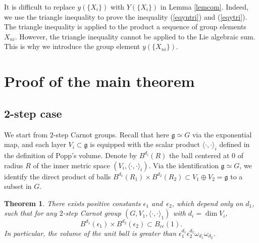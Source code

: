 \documentclass[10pt,a4paper]{amsart}
\numberwithin{equation}{section}
\newtheorem{Theorem}{Theorem}[section]
\newcommand{\g}{\mathfrak{g}}
\begin{document}
\begin{Remark}
 It is difficult to replace $y(\{X_i\})$ with $Y(\{X_i\})$ in Lemma \ref{lemcom}.
 Indeed,
 we use the triangle inequality to prove the inequality (\ref{eqyntri}) and (\ref{eqytri}).
 The triangle inequality is applied to the product a sequence of group elements $X_{ni}$.
 However, the triangle inequality cannot be applied to the Lie algebraic sum.
 This is why we introduce the group element $y(\{X_{ni}\})$.
\end{Remark}

\section{Proof of the main theorem}

\subsection{2-step case}

We start from $2$-step Carnot groups.
Recall that here $\g\simeq G$ via the exponential map,
and each layer $V_i\subset \g$ is equipped with the scalar product $\langle\cdot,\cdot\rangle_i$ defined in the definition of Popp's volume.
Denote by $B^{d_i}(R)$ the ball centered at $0$ of radius $R$ of the inner metric space $(V_i,\langle\cdot,\cdot\rangle_i)$.
Via the identification $\g\simeq G$,
we identify the direct product of balls $B^{d_1}(R_1)\times B^{d_2}(R_2)\subset V_1\oplus V_2=\g$ to a subset in $G$.

\begin{Theorem}\label{propstep2}
 There exists positive constants $\epsilon_1$ and~$\epsilon_2$,
 which depend only on $d_1$,
 such that for any $2$-step Carnot group $(G,V_1,\langle\cdot,\cdot\rangle_1)$ with $d_i=\dim V_i$,
 \[
 B^{d_1}(\epsilon_1)\times B^{d_2}(\epsilon_2)\subset B_{cc}(1).
 \]
 In particular,
 the volume of the unit ball is greater than $\epsilon_1^{d_1}\epsilon_2^{d_2}\omega_{d_1}\omega_{d_2}$.
\end{Theorem}
\end{document}
